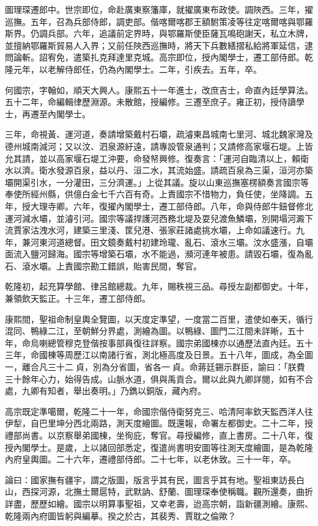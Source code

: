 \begin{pinyinscope}
圖理琛遷郎中。世宗即位，命赴廣東察籓庫，就擢廣東布政使。調陜西。三年，擢巡撫。五年，召為兵部侍郎，調吏部。偕喀爾喀郡王額駙策凌等往定喀爾喀與鄂羅斯界。仍調兵部。六年，追議前定界時，與鄂羅斯使臣薩瓦鳴砲謝天，私立木牌，並擅納鄂羅斯貿易人入界；又前任陜西巡撫時，將天下兵數繕摺私給將軍延信，逮問論斬。詔宥免，遣築扎克拜達里克城。高宗即位，授內閣學士，遷工部侍郎。乾隆元年，以老解侍郎任，仍為內閣學士。二年，引疾去。五年，卒。

何國宗，字翰如，順天大興人。康熙五十一年進士，改庶吉士，命直內廷學算法。五十二年，命編輯律歷淵源。未散館，授編修。三遷至庶子。雍正初，授侍讀學士，再遷至內閣學士。

三年，命視黃、運河道，奏請增築戴村石壩，疏濬東昌城南七里河、城北魏家灣及德州城南減河；又以汶、泗泉源紆遠，請專設管泉通判；又請修高家堰石堤。上皆允其請，並以高家堰石堤工沖要，命發帑興修。復奏言：「運河自臨清以上，賴衛水以濟。衛水發源百泉，益以丹、洹二水，其流始盛。請疏百泉為三渠，洹河亦築壩開渠引水，一分灌田，三分濟運。」上從其議。旋以山東巡撫塞楞額奏言國宗等奉使所經州縣，供億白金七千六百有奇。上責國宗不惜物力，負任使，坐降調。五年，授大理寺卿。六年，復擢內閣學士，遷工部侍郎。八年，命與侍郎牛鈕督修北運河減水壩，並濬引河。國宗等議捍護河西務北堤及耍兒渡魚鱗壩，別開塌河澱下流賈家沽洩水河，建築三里淺、筐兒港、張家莊諸處挑水壩，上命如議速行。九年，兼河東河道總督。田文鏡奏戴村初建玲瓏、亂石、滾水三壩。汶水盛漲，自壩面流入鹽河歸海。國宗等增築石壩，水不能過，瀕河連年被患。請毀石壩，復為亂石、滾水壩。上責國宗勘工錯誤，貽害民間，奪官。

乾隆初，起充算學館、律呂館總裁。九年，賜秩視三品。尋授左副都御史。十年，兼領飲天監正。十三年，遷工部侍郎。

康熙間，聖祖命制皇輿全覽圖，以天度定準望，一度當二百里，遣使如奉天，循行混同、鴨綠二江，至朝鮮分界處，測繪為圖。以鴨綠、圖門二江間未詳晰，五十年，命烏喇總管穆克登偕按事部員復往詳察。國宗弟國棟亦以通歷法直內廷。五十三年，命國棟等周歷江以南諸行省，測北極高度及日景。五十八年，圖成，為全圖一，離合凡三十二貞，別為分省圖，省各一貞。命蔣廷錫示群臣，諭曰：「朕費三十餘年心力，始得告成。山脈水道，俱與禹貢合。爾以此與九卿詳閱，如有不合處，九卿有知者，舉出奏明。」乃鐫以銅版，藏內府。

高宗既定準噶爾，乾隆二十一年，命國宗偕侍衛努克三、哈清阿率欽天監西洋人往伊犁，自巴里坤分西北兩路，測天度繪圖。既還報，命署左都御史。二十二年，授禮部尚書。以京察舉弟國棟，坐徇庇，奪官。尋授編修，直上書房。二十八年，復授內閣學士。是歲，上以諸回部悉定，復遣尚書明安圖等往測天度繪圖，是為乾隆內府皇輿圖。二十六年，遷禮部侍郎。二十七年，以老休致。三十一年，卒。

論曰：國家撫有疆宇，謂之版圖，版言乎其有民，圖言乎其有地。聖祖東訪長白山，西探河源，北撫土爾扈特，武默訥、舒蘭、圖理琛奉使稱職。觀所還奏，曲折詳盡，歷歷如繪。國宗以明算事聖祖，又幸老壽，迨高宗朝，詣新疆測繪。康熙、乾隆兩內府圖皆躬與編摹。揆之於古，其裴秀、賈耽之倫歟？


\end{pinyinscope}